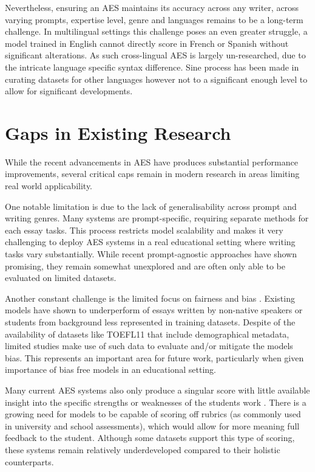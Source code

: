 \documentclass[12pt,a4paper]{report}
\begin{document}
Nevertheless, ensuring an AES maintains its accuracy across any writer, across varying prompts, expertise level, genre and languages remains to be a long-term challenge. In multilingual settings this challenge poses an even greater struggle, a model trained in English cannot directly score in French or Spanish without significant alterations. As such cross-lingual AES is largely un-researched, due to the intricate language specific syntax difference. Sine process has been made in curating datasets for other languages however not to a significant enough level to allow for significant developments.


\section{Gaps in Existing Research}
While the recent advancements in AES have produces substantial performance improvements, several critical caps remain in modern research in areas limiting real world applicability.

One notable limitation is due to the lack of generalisability across prompt and writing genres. Many systems are prompt-specific, requiring separate methods for each essay tasks. This process restricts model scalability and makes it very challenging to deploy AES systems in a real educational setting where writing tasks vary substantially. While recent prompt-agnostic approaches have shown promising, they remain somewhat unexplored and are often only able to be evaluated on limited datasets.

Another constant challenge is the limited focus on fairness and bias \citep{litman2024fairness}. Existing models have shown to underperform of essays written by non-native speakers or students from background less represented in training datasets. Despite of the availability of datasets like TOEFL11 that include demographical metadata, limited studies make use of such data to evaluate and/or mitigate the models bias. This represents an important area for future work, particularly when given importance of bias free models in an educational setting.

Many current AES systems also only produce a singular score with little available insight into the specific strengths or weaknesses of the students work \citep{landauer2003iea}. There is a growing need for models to be capable of scoring off rubrics (as commonly used in university and school assessments), which would allow for more meaning full feedback to the student. Although some datasets support this type of scoring, these systems remain relatively underdeveloped compared to their holistic counterparts.
\end{document}
